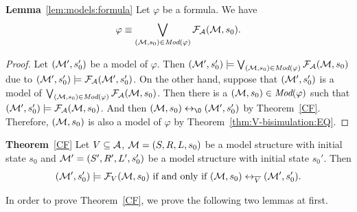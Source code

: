 \documentclass{article}
\begin{document}
\textbf{Lemma}~\ref{lem:models:formula} Let $\varphi$ be a formula. We have
  \begin{equation}
    \varphi\equiv \bigvee_{({\cal M}, s_0)\in\textit{Mod}(\varphi)}{\cal F}_{\cal A}({\cal M}, s_0).
    \end{equation}
\begin{proof}
Let $({\cal M}', s_0')$ be a model of $\varphi$. Then $({\cal M}', s_0') \models \bigvee_{({\cal M}, s_0)\in \textit{Mod}(\varphi)} {\cal F}_{{\cal A}}({\cal M}, s_0)$ due to $({\cal M}', s_0') \models {\cal F}_{{\cal A}}({\cal M}', s_0')$. On the other hand, suppose that $({\cal M}', s_0')$ is a model of $\bigvee_{({\cal M}, s_0)\in \textit{Mod}(\varphi)} {\cal F}_{{\cal A}}({\cal M}, s_0)$. Then there is a $({\cal M}, s_0)\in \textit{Mod}(\varphi)$ such that $({\cal M}', s_0') \models {\cal F}_{{\cal A}}({\cal M}, s_0)$. And then $(\Hm, s_0) \lrto_{\O} (\Hm', s_0')$ by Theorem~\ref{CF}. Therefore, $({\cal M}, s_0)$ is also a model of $\varphi$ by Theorem~\ref{thm:V-bisimulation:EQ}.
\end{proof}


\textbf{Theorem}~\ref{CF} Let $V\subseteq {\cal A}$, ${\cal M}=(S,R,L,s_0)$ be a model structure with initial state $s_0$
and ${\cal M}'=(S',R', L',s_0')$ be a model structure with initial state $s_0'$.
Then  $$({\cal M}',s_0') \models {\cal F}_V({\cal M},s_0)
\mbox{ if and only if }
({\cal M},s_0) \leftrightarrow_{\overline V} ({\cal M}',s_0').$$

In order to prove Theorem~\ref{CF}, we prove the following two lemmas at first.
\end{document}
